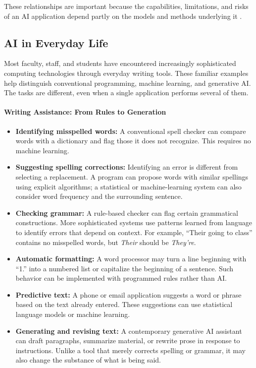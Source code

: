 \documentclass[11pt]{article}
\begin{document}
These relationships are important because the capabilities,
limitations, and risks of an AI application depend partly on
the models and methods underlying it \citep{Bommasani2021}.

\FloatBarrier
\subsection{AI in Everyday Life}

Most faculty, staff, and students have encountered increasingly sophisticated computing
technologies through everyday writing tools. These familiar examples
help distinguish conventional programming, machine learning, and
generative AI. The tasks are different, even when a single application
performs several of them.

\paragraph{Writing Assistance: From Rules to Generation}

\begingroup
\setlength{\leftmargini}{1em}
\begin{itemize}

\item \textbf{Identifying misspelled words:}
A conventional spell checker can compare words with a dictionary and
flag those it does not recognize. This requires no machine learning.

\item \textbf{Suggesting spelling corrections:}
Identifying an error is different from selecting a replacement. A
program can propose words with similar spellings using explicit
algorithms; a statistical or machine-learning system can also consider
word frequency and the surrounding sentence.

\item \textbf{Checking grammar:}
A rule-based checker can flag certain grammatical constructions.
More sophisticated systems use patterns learned from language to
identify errors that depend on context. For example, ``Their going
to class'' contains no misspelled words, but \emph{Their} should be
\emph{They're}.

\item \textbf{Automatic formatting:}
A word processor may turn a line beginning with ``1.'' into a numbered
list or capitalize the beginning of a sentence. Such behavior can be
implemented with programmed rules rather than AI.

\item \textbf{Predictive text:}
A phone or email application suggests a word or phrase based on the
text already entered. These suggestions can use statistical language
models or machine learning.

\item \textbf{Generating and revising text:}
A contemporary generative AI assistant can draft paragraphs, summarize
material, or rewrite prose in response to instructions. Unlike a tool
that merely corrects spelling or grammar, it may also change the
substance of what is being said.
\end{itemize}
\endgroup
\end{document}

